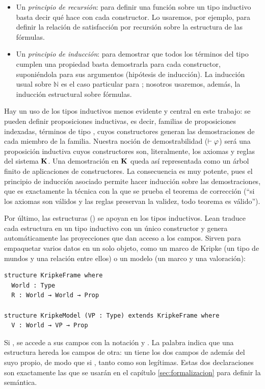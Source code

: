 \begin{itemize}
  \item Un \emph{principio de recursión}: para definir una función sobre un tipo inductivo basta decir qué hace con cada constructor. Lo usaremos, por ejemplo, para definir la relación de satisfacción por recursión sobre la estructura de las fórmulas.
  \item Un \emph{principio de inducción}: para demostrar que todos los términos del tipo cumplen una propiedad basta demostrarla para cada constructor, suponiéndola para sus argumentos (hipótesis de inducción). La inducción usual sobre $\mathbb{N}$ es el caso particular para ; nosotros usaremos, además, la inducción estructural sobre fórmulas.
\end{itemize}

Hay un uso de los tipos inductivos menos evidente y central en este trabajo: se pueden definir proposiciones inductivas, es decir, familias de proposiciones indexadas, términos de tipo , cuyos constructores generan las demostraciones de cada miembro de la familia. Nuestra noción de demostrabilidad ($\vdash \varphi$) será una proposición inductiva cuyos constructores son, literalmente, los axiomas y reglas del sistema $\mathbf{K}$. Una demostración en $\mathbf{K}$ queda así representada como un árbol finito de aplicaciones de constructores. La consecuencia es muy potente, pues el principio de inducción asociado permite hacer inducción sobre las demostraciones, que es exactamente la técnica con la que se prueba el teorema de corrección (``si los axiomas son válidos y las reglas preservan la validez, todo teorema es válido'').

Por último, las estructuras () se apoyan en los tipos inductivos. Lean traduce cada estructura en un tipo inductivo con un único constructor y genera automáticamente las proyecciones que dan acceso a los campos. Sirven para empaquetar varios datos en un solo objeto, como un marco de Kripke (un tipo de mundos y una relación entre ellos) o un modelo (un marco y una valoración):

\begin{lstlisting}
structure KripkeFrame where
  World : Type
  R : World → World → Prop

structure KripkeModel (VP : Type) extends KripkeFrame where
  V : World → VP → Prop
\end{lstlisting}

Si , se accede a sus campos con la notación  y . La palabra  indica que una estructura hereda los campos de otra: un  tiene los dos campos de  además del suyo propio, de modo que si , tanto  como  son legítimas. Estas dos declaraciones son exactamente las que se usarán en el capítulo \ref{sec:formalizacion} para definir la semántica.

